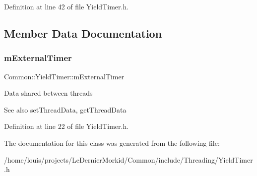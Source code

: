 Definition at line 42 of file Yield\+Timer.\+h.



\subsection{Member Data Documentation}
\mbox{\label{class_common_1_1_yield_timer_a4c2a436d618e91f6634ec932cf4e1a9c}} 
\subsubsection{\texorpdfstring{m\+External\+Timer}{mExternalTimer}}
{\footnotesize\ttfamily Common\+::\+Yield\+Timer\+::m\+External\+Timer\hspace{0.3cm}{\ttfamily [private]}}

Data shared between threads \begin{DoxySeeAlso}{See also}
set\+Thread\+Data, get\+Thread\+Data 
\end{DoxySeeAlso}


Definition at line 22 of file Yield\+Timer.\+h.



The documentation for this class was generated from the following file\+:\begin{DoxyCompactItemize}
\item 
/home/louis/projects/\+Le\+Dernier\+Morkid/\+Common/include/\+Threading/Yield\+Timer.\+h\end{DoxyCompactItemize}
